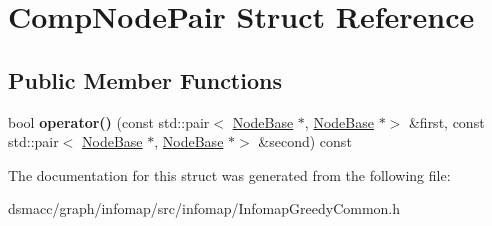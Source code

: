\hypertarget{structCompNodePair}{}\section{Comp\+Node\+Pair Struct Reference}
\label{structCompNodePair}
\subsection*{Public Member Functions}
\begin{DoxyCompactItemize}
\item 
\mbox{\label{structCompNodePair_a9706c9b919b0558d370fe59770a4dabb}} 
bool {\bfseries operator()} (const std\+::pair$<$ \mbox{\hyperlink{classNodeBase}{Node\+Base}} $\ast$, \mbox{\hyperlink{classNodeBase}{Node\+Base}} $\ast$$>$ \&first, const std\+::pair$<$ \mbox{\hyperlink{classNodeBase}{Node\+Base}} $\ast$, \mbox{\hyperlink{classNodeBase}{Node\+Base}} $\ast$$>$ \&second) const
\end{DoxyCompactItemize}


The documentation for this struct was generated from the following file\+:\begin{DoxyCompactItemize}
\item 
dsmacc/graph/infomap/src/infomap/Infomap\+Greedy\+Common.\+h\end{DoxyCompactItemize}
